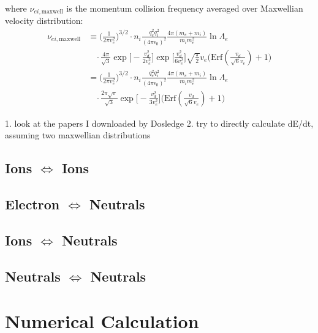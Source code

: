 \documentclass{article}
\begin{document}
where $\nu_{ei,\text{maxwell}}$ is the momentum collision frequency averaged over Maxwellian velocity distribution:
\begin{equation}
	\begin{split}
		\nu_{ei,\text{maxwell}} &\equiv \Big(\frac{1}{2\pi v_e^2} \Big)^{3/2} \cdot n_i\frac{q_e^2 q_i^2}{(4\pi \epsilon_0 )^2}\frac{4\pi(m_e+m_i)}{m_i m_e^2} \ln \Lambda_e \\
		 &\ \ \ \ \cdot \frac{4\pi}{\sqrt{3}} \exp\Big[-\frac{v_d^2}{2v_e^2} \Big] \exp\Big[\frac{v_d^2}{6v_e^2} \Big]\sqrt{\frac{\pi}{2}}v_e \Big(\text{Erf}(\frac{v_d}{\sqrt{6}v_e} ) + 1 \Big) \\
		 &= \Big(\frac{1}{2\pi v_e^2} \Big)^{3/2} \cdot n_i\frac{q_e^2 q_i^2}{(4\pi \epsilon_0 )^2}\frac{4\pi(m_e+m_i)}{m_i m_e^2} \ln \Lambda_e \\
		 &\ \ \ \ \cdot \frac{2\pi\sqrt{\pi}}{\sqrt{3}}\exp\Big[-\frac{v_d^2}{3v_e^2} \Big] \Big(\text{Erf}(\frac{v_d}{\sqrt{6}v_e} ) + 1 \Big)	
	\end{split}
\end{equation}

1. look at the papers I downloaded by Dosledge 2. try to directly calculate dE/dt, assuming two maxwellian distributions


\subsection{Ions $\Longleftrightarrow$ Ions}

\subsection{Electron $\Longleftrightarrow$ Neutrals}

\subsection{Ions $\Longleftrightarrow$ Neutrals}

\subsection{Neutrals $\Longleftrightarrow$ Neutrals}

\section{Numerical Calculation}

\label{section_model_comparision}
\end{document}

